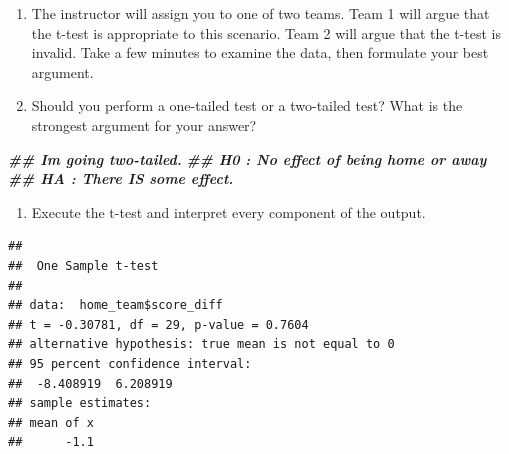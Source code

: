 \documentclass[
]{book}
\newenvironment{Shaded}{\begin{snugshade}}{\end{snugshade}}
\newcommand{\AttributeTok}[1]{\textcolor[rgb]{0.13,0.29,0.53}{#1}}
\newcommand{\DecValTok}[1]{\textcolor[rgb]{0.00,0.00,0.81}{#1}}
\newcommand{\DocumentationTok}[1]{\textcolor[rgb]{0.56,0.35,0.01}{\textbf{\textit{#1}}}}
\newcommand{\FunctionTok}[1]{\textcolor[rgb]{0.13,0.29,0.53}{\textbf{#1}}}
\newcommand{\NormalTok}[1]{#1}
\newcommand{\SpecialCharTok}[1]{\textcolor[rgb]{0.81,0.36,0.00}{\textbf{#1}}}
\newcommand{\StringTok}[1]{\textcolor[rgb]{0.31,0.60,0.02}{#1}}
\providecommand{\tightlist}{%
  \setlength{\itemsep}{0pt}\setlength{\parskip}{0pt}}
\theoremstyle{definition}
\theoremstyle{definition}
\theoremstyle{definition}
\theoremstyle{definition}
\theoremstyle{remark}
\begin{document}
\begin{enumerate}
\def\labelenumi{\arabic{enumi}.}
\item
  The instructor will assign you to one of two teams. Team 1 will argue that the t-test is appropriate to this scenario. Team 2 will argue that the t-test is invalid. Take a few minutes to examine the data, then formulate your best argument.
\item
  Should you perform a one-tailed test or a two-tailed test? What is the strongest argument for your answer?
\end{enumerate}

\begin{Shaded}
\begin{Highlighting}[]
\DocumentationTok{\#\# I\textquotesingle{}m going two{-}tailed. }
\DocumentationTok{\#\# H0 : No effect of being home or away}
\DocumentationTok{\#\# HA : There IS some effect. }
\end{Highlighting}
\end{Shaded}

\begin{enumerate}
\def\labelenumi{\arabic{enumi}.}
\setcounter{enumi}{2}
\tightlist
\item
  Execute the t-test and interpret every component of the output.
\end{enumerate}

\begin{Shaded}
\end{Shaded}

\begin{verbatim}
## 
##  One Sample t-test
## 
## data:  home_team$score_diff
## t = -0.30781, df = 29, p-value = 0.7604
## alternative hypothesis: true mean is not equal to 0
## 95 percent confidence interval:
##  -8.408919  6.208919
## sample estimates:
## mean of x 
##      -1.1
\end{verbatim}
\end{document}
